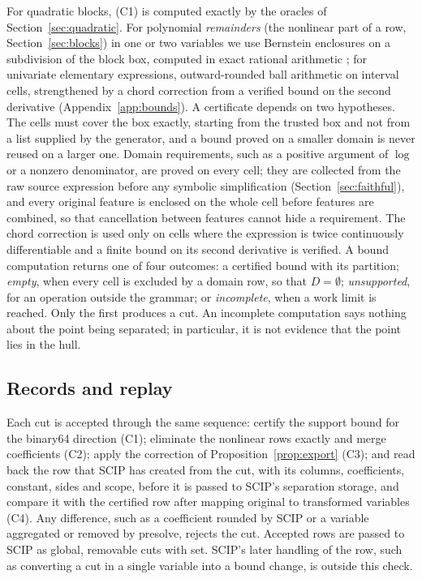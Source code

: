 For quadratic blocks, (C1) is computed exactly by the oracles of
Section~\ref{sec:quadratic}. For polynomial \emph{remainders} (the
nonlinear part of a row, Section~\ref{sec:blocks}) in one or two
variables we use Bernstein enclosures on a subdivision of the block box,
computed in exact rational arithmetic
\citep{GarloffJanssonSmith2003,GarloffSmith2008,MunozNarkawicz2013}; for
univariate elementary expressions, outward-rounded ball arithmetic
\citep{Johansson2017arb} on interval cells, strengthened by a chord
correction from a verified bound on the second derivative
(Appendix~\ref{app:bounds}). A certificate depends on two hypotheses. The
cells must cover the box exactly, starting from the trusted box and not from
a list supplied by the generator, and a bound proved on a smaller domain is
never reused on a larger one. Domain requirements, such as a positive
argument of $\log$ or a nonzero denominator, are proved on every cell; they
are collected from the raw source expression before any symbolic
simplification (Section~\ref{sec:faithful}), and every original feature is
enclosed on the whole cell before features are combined, so that
cancellation between features cannot hide a requirement. The chord
correction is used only on cells where the expression is twice continuously
differentiable and a finite bound on its second derivative is verified. A
bound computation returns one of four outcomes: a certified bound with its
partition; \emph{empty}, when every cell is excluded by a domain row, so that
$D=\emptyset$; \emph{unsupported}, for an operation outside the grammar; or
\emph{incomplete}, when a work limit is reached. Only the first produces a
cut. An incomplete computation says nothing about the point being separated;
in particular, it is not evidence that the point lies in the hull.

\subsection{Records and replay}\label{sec:replay}

Each cut is accepted through the same sequence: certify the support bound for
the binary64 direction (C1); eliminate the nonlinear rows exactly and merge
coefficients (C2); apply the correction of Proposition~\ref{prop:export} (C3);
and read back the row that SCIP has created from the cut, with its columns,
coefficients, constant, sides and scope, before it is passed to SCIP's
separation storage, and compare it with the certified row after mapping
original to transformed variables (C4). Any difference, such as a coefficient
rounded by SCIP or a variable aggregated or removed by presolve, rejects the
cut. Accepted rows are passed to SCIP as global, removable cuts with
 set. SCIP's later handling of the row, such as converting a
cut in a single variable into a bound change, is outside this check.

